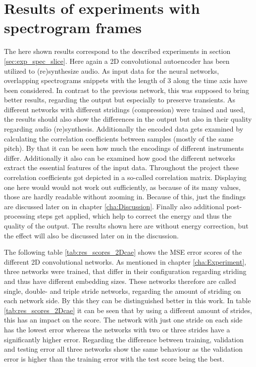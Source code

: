 \section{Results of experiments with spectrogram frames}
The here shown results correspond to the described experiments in section \ref{sec:exp_spec_slice}. Here again a 2D convolutional autoencoder has been utilized to (re)synthesize audio. As input data for the neural networks, overlapping spectrograms snippets with the length of 3 along the time axis have been considered. In contrast to the previous network, this was supposed to bring better results, regarding the output but especially to preserve transients. As different networks with different stridings (compression) were trained and used, the results should also show the differences in the output but also in their quality regarding audio (re)synthesis. Additionally the encoded data gets examined by calculating the correlation coefficients between samples (mostly of the same pitch). By that it can be seen how much the encodings of different instruments differ. Additionally it also can be examined how good the different networks extract the essential features of the input data. Throughout the project these correlation coefficients got depicted in a so-called correlation matrix. Displaying one here would would not work out sufficiently, as because of its many values, those are hardly readable without zooming in. Because of this, just the findings are discussed later on in chapter \ref{cha:Discussion}. Finally also additional post-processing steps get applied, which help to correct the energy and thus the quality of the output. The results shown here are without energy correction, but the effect will also be discussed later on in the discussion.

The following table \ref{tab:res_scores_2Dcae} shows the MSE error scores of the different 2D convolutional networks. As mentioned in chapter \ref{cha:Experiment}, three networks were trained, that differ in their configuration regarding striding and thus have different embedding sizes. These networks therefore are called single, double- and triple stride networks, regarding the amount of striding on each network side. By this they can be distinguished better in this work. In table \ref{tab:res_scores_2Dcae} it can be seen that by using a different amount of strides, this has an impact on the score. The network with just one stride on each side has the lowest error whereas the networks with two or three strides have a significantly higher error. Regarding the difference between training, validation and testing error all three networks show the same behaviour as the validation error is higher than the training error with the test score being the best. 

